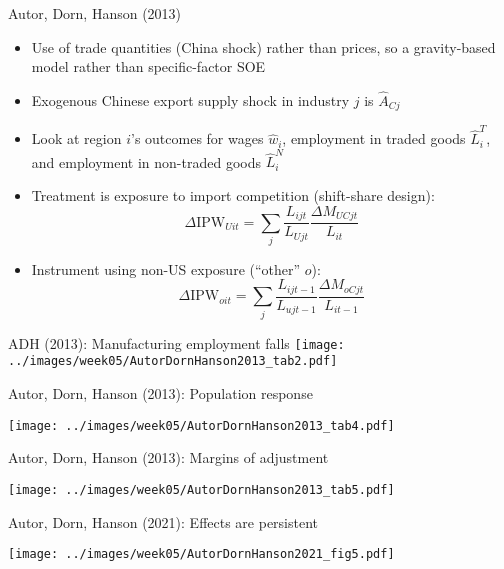 \documentclass[11pt,notes=hide,aspectratio=169]{beamer}
\begin{document}
\begin{frame}{Autor, Dorn, Hanson (2013)}
\begin{itemize}
	\item Use of trade quantities (China shock) rather than prices, so a gravity-based model rather than specific-factor SOE
	\item Exogenous Chinese export supply shock in industry $j$ is $\hat{A}_{Cj}$
	\item Look at region $i$'s outcomes for wages $\hat{w}_i$, employment in traded goods $\hat{L}^{T}_{i}$, and employment in non-traded goods $\hat{L}^{N}_{i}$
	\item Treatment is exposure to import competition (shift-share design):
	\begin{equation*}
		\Delta \text{IPW}_{Uit} = \sum_j \frac{L_{ijt}}{L_{Ujt}} \frac{\Delta M_{UCjt}}{L_{it}}
	\end{equation*}
	\item Instrument using non-US exposure (``other'' $o$):
	\begin{equation*}
		\Delta \text{IPW}_{oit} = \sum_j \frac{L_{ijt-1}}{L_{ujt-1}} \frac{\Delta M_{oCjt}}{L_{it-1}}
	\end{equation*}
\end{itemize}
\end{frame}
\begin{frame}{ADH (2013): Manufacturing employment falls}
\texttt{[image: ../images/week05/AutorDornHanson2013\_tab2.pdf]}
\end{frame}
\begin{frame}{Autor, Dorn, Hanson (2013): Population response}
\begin{center}\texttt{[image: ../images/week05/AutorDornHanson2013\_tab4.pdf]}\end{center}
\end{frame}
\begin{frame}{Autor, Dorn, Hanson (2013): Margins of adjustment}
\begin{center}\texttt{[image: ../images/week05/AutorDornHanson2013\_tab5.pdf]}\end{center}
\end{frame}
\begin{frame}{Autor, Dorn, Hanson (2021): Effects are persistent} 
\begin{center}\texttt{[image: ../images/week05/AutorDornHanson2021\_fig5.pdf]}\end{center}
\end{frame}
\end{document}
